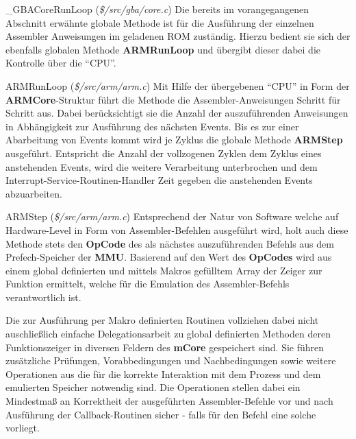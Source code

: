 \documentclass[11pt,a4paper]{scrartcl}
\begin{document}
\vspace{5mm}
\large {\_}GBACoreRunLoop \normalsize(\textit{\$/src/gba/core.c})
\vspace{2mm}\newline
Die bereits im vorangegangenen Abschnitt erw\"ahnte globale Methode ist f\"ur die Ausf\"uhrung der einzelnen Assembler Anweisungen im geladenen ROM zust\"andig. Hierzu bedient sie sich der ebenfalls globalen Methode \textbf{ARMRunLoop} und \"ubergibt dieser dabei die Kontrolle \"uber die \enquote{CPU}.

\vspace{5mm}
\large ARMRunLoop \normalsize(\textit{\$/src/arm/arm.c})
\vspace{2mm}\newline
Mit Hilfe der \"ubergebenen \enquote{CPU} in Form der \textbf{ARMCore}-Struktur f\"uhrt die Methode die Assembler-Anweisungen Schritt f\"ur Schritt aus. Dabei ber\"ucksichtigt sie die Anzahl der auszuf\"uhrenden Anweisungen in Abh\"angigkeit zur Ausf\"uhrung des n\"achsten Events. Bis es zur einer Abarbeitung von Events kommt wird je Zyklus die globale Methode \textbf{ARMStep} ausgef\"uhrt. Entspricht die Anzahl der vollzogenen Zyklen dem Zyklus eines anstehenden Events, wird die weitere Verarbeitung unterbrochen und dem Interrupt-Service-Routinen-Handler Zeit gegeben die anstehenden Events abzuarbeiten.

\vspace{5mm}
\large ARMStep \normalsize(\textit{\$/src/arm/arm.c})
\vspace{2mm}\newline
Entsprechend der Natur von Software welche auf Hardware-Level in Form von Assembler-Befehlen ausgef\"uhrt wird, holt auch diese Methode stets den \textbf{OpCode} des als n\"achstes auszuf\"uhrenden Befehls aus dem Prefech-Speicher der \textbf{MMU}. Basierend auf den Wert des \textbf{OpCodes} wird aus einem global definierten und mittels Makros gef\"ulltem Array der Zeiger zur Funktion ermittelt, welche f\"ur die Emulation des Assembler-Befehls verantwortlich ist.

Die zur Ausf\"uhrung per Makro definierten Routinen vollziehen dabei nicht auschlie{\ss}lich einfache Delegationsarbeit zu global definierten Methoden deren Funktionszeiger in diversen Feldern des \textbf{mCore} gespeichert sind. Sie f\"uhren zus\"atzliche Pr\"ufungen, Vorabbedingungen und Nachbedingungen sowie weitere Operationen aus die f\"ur die korrekte Interaktion mit dem Prozess und dem emulierten Speicher notwendig sind. Die Operationen stellen dabei ein Mindestma{\ss} an Korrektheit der ausgef\"uhrten Assembler-Befehle vor und nach Ausf\"uhrung der Callback-Routinen sicher - falls f\"ur den Befehl eine solche vorliegt.
\end{document}
